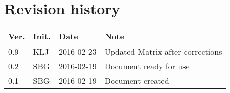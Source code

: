 \chapter*{Revision history}
\label{app:rev_his}


\begin{tabular}{b{1cm} b{1cm} b{2cm} b{8cm}}
    \textbf{Ver.} & \textbf{Init.} & \textbf{Date} & \textbf{Note} \\
    \hline
    0.9 & KLJ & 2016-02-23 & Updated Matrix after corrections \\
    0.2 & SBG & 2016-02-19 & Document ready for use \\
    0.1 & SBG & 2016-02-19 & Document created \\
\end{tabular}
